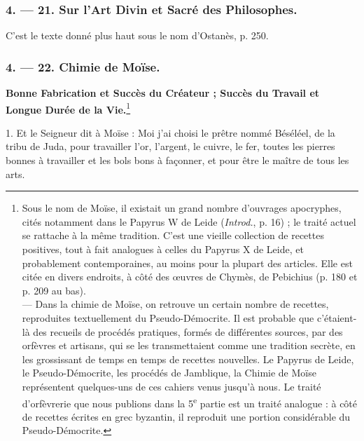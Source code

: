 \documentclass[a4paper, 11pt, oneside, polutonikogreek, french]{article}
\begin{document}
\bigskip
\centerline{\EightStarTaper}
\centerline{\EightStarTaper\EightStarTaper}
\bigskip

\subsubsection{4. --- 21. Sur l'Art Divin et Sacré des Philosophes.}

C'est le texte donné plus haut sous le nom d'Ostanès, p. 250.

\bigskip
\centerline{\EightStarTaper}
\centerline{\EightStarTaper\EightStarTaper}
\bigskip

\subsubsection{4. --- 22. Chimie de Moïse.}

\textbf{Bonne Fabrication et Succès du Créateur ; Succès du Travail et Longue Durée de la Vie.}\footnote{Sous le nom de Moïse, il existait un grand nombre d'ouvrages apocryphes, cités notamment dans le Papyrus W de Leide (\emph{Introd.}, p. 16) ; le traité actuel se rattache à la même tradition. C'est une vieille collection de recettes positives, tout à fait analogues à celles du Papyrus X de Leide, et probablement contemporaines, au moins pour la plupart des articles. Elle est citée en divers endroits, à côté des œuvres de Chymès, de Pebichius (p. 180 et p. 209 au bas).\\\hspace*{5mm}--- Dans la chimie de Moïse, on retrouve un certain nombre de recettes, reproduites textuellement du Pseudo-Démocrite. Il est probable que c'étaient-là des recueils de procédés pratiques, formés de différentes sources, par des orfèvres et artisans, qui se les transmettaient comme une tradition secrète, en les grossissant de temps en temps de recettes nouvelles. Le Papyrus de Leide, le Pseudo-Démocrite, les procédés de Jamblique, la Chimie de Moïse représentent quelques-uns de ces cahiers venus jusqu'à nous. Le traité d'orfèvrerie que nous publions dans la 5\textsuperscript{e} partie est un traité analogue : à côté de recettes écrites en grec byzantin, il reproduit une portion considérable du Pseudo-Démocrite.}

1. Et le Seigneur dit à Moïse : Moi j'ai choisi le prêtre nommé Béséléel, de la tribu de Juda, pour travailler l'or, l'argent, le cuivre, le fer, toutes les pierres bonnes à travailler et les bols bons à façonner, et pour être le maître de tous les arts.
\end{document}
